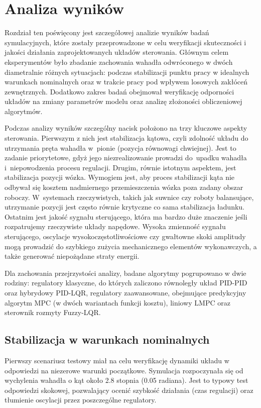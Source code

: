 \section{Analiza wyników}

Rozdział ten poświęcony jest szczegółowej analizie wyników badań symulacyjnych, które zostały
przeprowadzone w celu weryfikacji skuteczności i jakości działania zaprojektowanych układów
sterowania. Głównym celem eksperymentów było zbadanie zachowania wahadła odwróconego w dwóch
diametralnie różnych sytuacjach: podczas stabilizacji punktu pracy w idealnych warunkach
nominalnych oraz w trakcie pracy pod wpływem losowych zakłóceń zewnętrznych.
Dodatkowo zakres badań obejmował weryfikację odporności układów na zmiany parametrów modelu
oraz analizę złożoności obliczeniowej algorytmów.

Podczas analizy wyników szczególny nacisk położono na trzy kluczowe  aspekty sterowania. 
Pierwszym z nich jest stabilizacja kątowa, czyli zdolność układu do
utrzymania pręta wahadła w~pionie (pozycja równowagi chwiejnej). Jest to zadanie priorytetowe,
gdyż jego niezrealizowanie prowadzi do~upadku wahadła i~niepowodzenia procesu regulacji. Drugim, równie
istotnym aspektem, jest stabilizacja pozycji wózka. Wymogiem jest, aby proces stabilizacji
kąta nie odbywał się kosztem nadmiernego przemieszczenia wózka poza zadany obszar roboczy. W~systemach
rzeczywistych, takich jak suwnice czy roboty balansujące, utrzymanie pozycji jest często równie
krytyczne co sama stabilizacja ładunku. Ostatnim jest jakość sygnału sterującego, która ma bardzo duże znaczenie 
jeśli rozpatrujemy rzeczywiste układy napędowe. Wysoka zmienność sygnału sterującego, oscylacje wysokoczęstotliwościowe 
czy gwałtowne skoki amplitudy mogą prowadzić do szybkiego zużycia mechanicznego elementów wykonawczych, a także generować 
niepożądane straty energii.

Dla zachowania przejrzystości analizy, badane algorytmy pogrupowano w dwie rodziny: regulatory
klasyczne, do których zaliczono równoległy układ PID-PID oraz hybrydowy PID-LQR, regulatory
zaawansowane, obejmujące predykcyjny algorytm MPC (w dwóch wariantach funkcji kosztu), liniowy LMPC oraz
sterownik rozmyty Fuzzy-LQR.

\subsection{Stabilizacja w warunkach nominalnych}

Pierwszy scenariusz testowy miał na celu weryfikację dynamiki układu w odpowiedzi na niezerowe
warunki początkowe. Symulacja rozpoczynała się od wychylenia wahadła o kąt około 2.8 stopnia
(0.05 radiana). Jest to typowy test odpowiedzi skokowej, pozwalający ocenić szybkość działania
(czas regulacji) oraz tłumienie oscylacji przez poszczególne regulatory.

